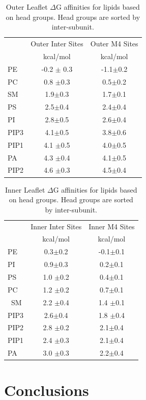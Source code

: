\documentclass[preprint,3p,9pt,times,onecolumn]{elsarticle}
\begin{document}
\begin{table}
	\caption{Outer Leaflet $\Delta$G affinities for lipids based on head groups. Head groups are sorted by inter-subunit.}
    \centering
    \begin{tabular}{|l||c|c|}
    \hline
	{} &  Outer Inter Sites&  Outer M4 Sites\\
	{} & kcal/mol & kcal/mol\\
	\hline
	PE	&-0.2 $\pm$ 0.3& -1.1$\pm$0.2\\
	PC	& 0.8 $\pm$0.3 &  0.5$\pm$0.2\\
	SM	&1.9$\pm$0.3 &  1.7$\pm$0.1\\
	PS	&2.5$\pm$0.4 &  2.4$\pm$0.4\\
	PI	&2.8$\pm$0.5 &  2.6$\pm$0.4\\
	PIP3 &4.1$\pm$0.5 &  3.8$\pm$0.6 \\
	PIP1 &4.1 $\pm$0.5&  4.0$\pm$0.5\\
	PA &4.3 $\pm$0.4&  4.1$\pm$0.5\\
	PIP2 &4.6 $\pm$0.3&  4.5$\pm$0.4\\
	\hline
    \end{tabular}
    \label{tab:dGOuterHG}
\end{table}

\begin{table}
	\caption{Inner Leaflet $\Delta$G affinities for lipids based on head groups. Head groups are sorted by inter-subunit.}
    \centering
    \begin{tabular}{|l||c|c|}
    \hline
	{} &  Inner Inter Sites&  Inner M4 Sites\\
	{} & kcal/mol & kcal/mol\\
	\hline
	PE& 0.3$\pm$0.2& -0.1$\pm$0.1\\
	PI&0.9$\pm$0.3 &  0.2$\pm$0.1\\
	PS&1.0 $\pm$0.2	&  0.4$\pm$0.1\\
	PC&1.2 $\pm$0.2	&  0.7$\pm$0.1\\\
	SM&2.2 $\pm$0.4	&  1.4 $\pm$0.1\\
	PIP3	&2.6$\pm$0.4	 &  1.8 $\pm$0.4\\
	PIP2	&2.8 $\pm$0.2	&  2.1$\pm$0.4\\
	PIP1	&2.4 $\pm$0.3	&  2.1$\pm$0.4\\
	PA	&3.0 $\pm$0.3	&  2.2$\pm$0.4\\
	\hline
    \end{tabular}
    \label{tab:dGInnerHG}
\end{table}

\section{Conclusions}
\end{document}
